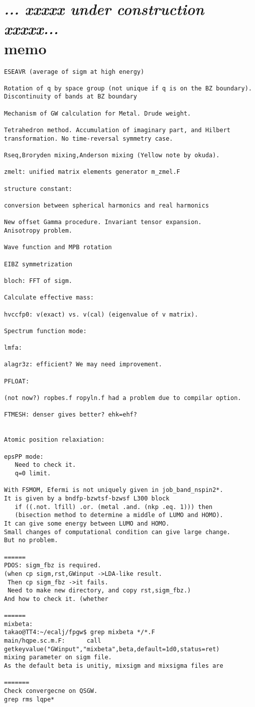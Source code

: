 \documentclass[a4paper,10pt,fleqn]{article}
\def\underconstruction{{\it... xxxxx under construction xxxxx...\\}}
\begin{document}
\section{\underconstruction memo}
\begin{verbatim}
ESEAVR (average of sigm at high energy)

Rotation of q by space group (not unique if q is on the BZ boundary).
Discontinuity of bands at BZ boundary

Mechanism of GW calculation for Metal. Drude weight.

Tetrahedron method. Accumulation of imaginary part, and Hilbert transformation. No time-reversal symmetry case.

Rseq,Broryden mixing,Anderson mixing (Yellow note by okuda).

zmelt: unified matrix elements generator m_zmel.F

structure constant:

conversion between spherical harmonics and real harmonics

New offset Gamma procedure. Invariant tensor expansion.
Anisotropy problem.

Wave function and MPB rotation 

EIBZ symmetrization

bloch: FFT of sigm.

Calculate effective mass:

hvccfp0: v(exact) vs. v(cal) (eigenvalue of v matrix).

Spectrum function mode:

lmfa:

alagr3z: efficient? We may need improvement.

PFLOAT:

(not now?) ropbes.f ropyln.f had a problem due to compilar option.

FTMESH: denser gives better? ehk=ehf?


Atomic position relaxiation:

epsPP mode:
   Need to check it.
   q=0 limit.

With FSMOM, Efermi is not uniquely given in job_band_nspin2*.
It is given by a bndfp-bzwtsf-bzwsf L300 block
   if ((.not. lfill) .or. (metal .and. (nkp .eq. 1))) then
   (bisection method to determine a middle of LUMO and HOMO).
It can give some energy between LUMO and HOMO. 
Small changes of computational condition can give large change. 
But no problem.

======
PDOS: sigm_fbz is required.
(when cp sigm,rst,GWinput ->LDA-like result.
 Then cp sigm_fbz ->it fails.
 Need to make new directory, and copy rst,sigm_fbz.)
And how to check it. (whether 

======
mixbeta:
takao@TT4:~/ecalj/fpgw$ grep mixbeta */*.F
main/hqpe.sc.m.F:      call getkeyvalue("GWinput","mixbeta",beta,default=1d0,status=ret)
mixing parameter on sigm file.
As the default beta is unitiy, mixsigm and mixsigma files are 

=======
Check convergecne on QSGW.
grep rms lqpe*

\end{verbatim}




%

\newpage
\printindex

\end{document}
